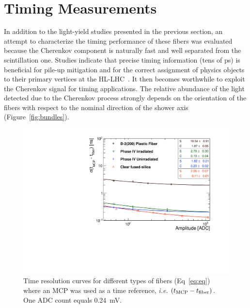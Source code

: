 \documentclass[a4paper,11pt]{article}
\begin{document}
\section{Timing Measurements}
\label{sec:timing}
In addition to the light-yield studies presented in the previous section, an attempt to characterize the timing performance of these fibers was evaluated because the Cherenkov component is naturally fast and well separated from the scintillation one. Studies indicate that precise timing information (tens of ps) is beneficial for pile-up mitigation and for the correct assignment of physics objects to their primary vertices at the HL-LHC~\cite{r-timingATLAS,r-timingCMS}. It then becomes worthwhile to exploit the Cherenkov signal for timing applications.  The relative abundance of the light detected due to the Cherenkov process  strongly depends on the orientation of the fibers with respect to the nominal direction of the shower axis (Figure~\ref{fig:bundles}). 

\begin{figure}[ht]
\begin{center}
      \includegraphics[width=12cm]{Figures/fibres_time_res}
\caption{\small Time resolution curves for different types of fibers (Eq~\ref{eq:eq}) where an MCP was used as a time reference, {\it i.e.} $(t_{\rm MCP} - t_{\rm fiber})$.  One ADC count equals 0.24~mV.}
    \label{fig:fibres_time_res}
\end{center}
\end{figure}
\end{document}
